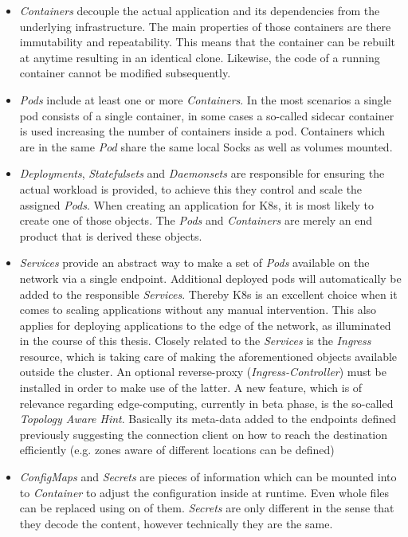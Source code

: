 \documentclass[MSC,Master,english]{twbook}%
\begin{document}
\begin{itemize}
    \item \textit{Containers} decouple the actual application and its dependencies from the underlying infrastructure. The main properties of those containers are there immutability and repeatability. This means that the container can be rebuilt at anytime resulting in an identical clone. Likewise, the code of a running container cannot be modified subsequently.
    \item \textit{Pods} include at least one or more \textit{Containers}. In the most scenarios a single pod consists of a single container, in some cases a so-called sidecar container is used increasing the number of containers inside a pod. Containers which are in the same \textit{Pod} share the same local Socks as well as volumes mounted.
    \item \textit{Deployments}, \textit{Statefulsets} and \textit{Daemonsets} are responsible for ensuring the actual workload is provided, to achieve this they control and scale the assigned \textit{Pods}. When creating an application for \ac{K8s}, it is most likely to create one of those objects. The \textit{Pods} and \textit{Containers} are merely an end product that is derived these objects.
    \item \textit{Services} provide an abstract way to make a set of \textit{Pods} available on the network via a single endpoint. Additional deployed pods will automatically be added to the responsible \textit{Services}. Thereby \ac{K8s} is an excellent choice when it comes to scaling applications without any manual intervention. This also applies for deploying applications to the edge of the network, as illuminated in the course of this thesis. Closely related to the \textit{Services} is the \textit{Ingress} resource, which is taking care of making the aforementioned objects available outside the cluster. An optional reverse-proxy (\textit{Ingress-Controller}) must be installed in order to make use of the latter. \newline
    A new feature, which is of relevance regarding edge-computing, currently in beta phase, is the so-called \textit{Topology Aware Hint}. Basically its meta-data added to the endpoints defined previously suggesting the connection client on how to reach the destination efficiently (e.g. zones aware of different locations can be defined)
    \item \textit{ConfigMaps} and \textit{Secrets} are pieces of information which can be mounted into to \textit{Container} to adjust the configuration inside at runtime. Even whole files can be replaced using on of them. \textit{Secrets} are only different in the sense that they decode the content, however technically they are the same.

\end{itemize}
\end{document}
